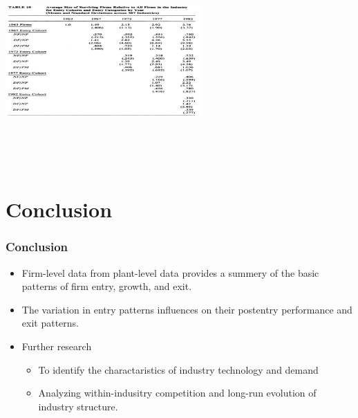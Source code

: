 \documentclass[dvipdfmx,12pt]{beamer}
\begin{document}
\begin{frame}

\begin{center}

\includegraphics[width=7.5cm,height=8cm]{DRS_T10.pdf}

\end{center}

\end{frame}

\section{Conclusion}
\begin{frame}\frametitle{Conclusion}

 \begin{itemize}
 
 \item Firm-level data from plant-level data provides a summery of the basic patterns of firm entry, growth, and exit.
 
 \item The variation in entry patterns influences on their postentry performance and exit patterns.
 
 \item Further research
 
  \begin{itemize}
  
  \item To identify the charactaristics of industry technology and demand
  
  \item Analyzing within-indusitry competition and long-run evolution of industry structure.
  
  \end{itemize}
 
 \end{itemize}


\end{frame}
\end{document}
